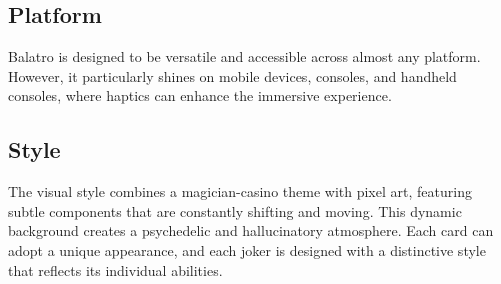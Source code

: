 \documentclass[a4paper,10pt,english]{article}
\begin{document}
\subsection*{Platform}

Balatro is designed to be versatile and accessible across almost any platform. However, it particularly shines on mobile devices, consoles, and handheld consoles, where haptics can enhance the immersive experience. \textbf{}


\subsection*{Style}
The visual style combines a magician-casino theme with pixel art, featuring subtle components that are constantly shifting and moving. This dynamic background creates a psychedelic and hallucinatory atmosphere. Each card can adopt a unique appearance, and each joker is designed with a distinctive style that reflects its individual abilities.
\end{document}
